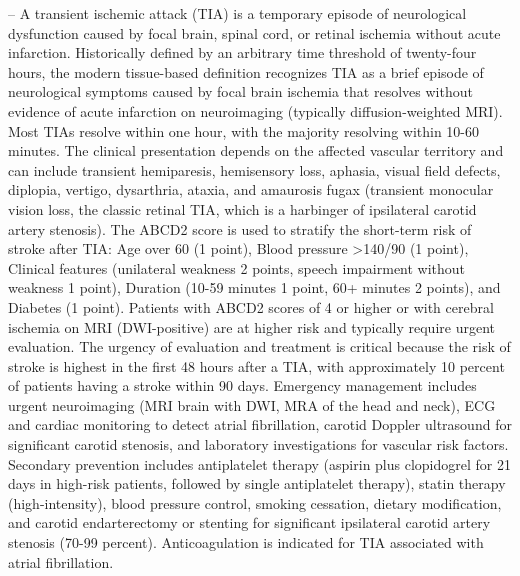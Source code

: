 -- A transient ischemic attack (TIA) is a temporary episode of neurological dysfunction caused by focal brain, spinal cord, or retinal ischemia without acute infarction. Historically defined by an arbitrary time threshold of twenty-four hours, the modern tissue-based definition recognizes TIA as a brief episode of neurological symptoms caused by focal brain ischemia that resolves without evidence of acute infarction on neuroimaging (typically diffusion-weighted MRI). Most TIAs resolve within one hour, with the majority resolving within 10-60 minutes. The clinical presentation depends on the affected vascular territory and can include transient hemiparesis, hemisensory loss, aphasia, visual field defects, diplopia, vertigo, dysarthria, ataxia, and amaurosis fugax (transient monocular vision loss, the classic retinal TIA, which is a harbinger of ipsilateral carotid artery stenosis). The ABCD2 score is used to stratify the short-term risk of stroke after TIA: Age over 60 (1 point), Blood pressure >140/90 (1 point), Clinical features (unilateral weakness 2 points, speech impairment without weakness 1 point), Duration (10-59 minutes 1 point, 60+ minutes 2 points), and Diabetes (1 point). Patients with ABCD2 scores of 4 or higher or with cerebral ischemia on MRI (DWI-positive) are at higher risk and typically require urgent evaluation. The urgency of evaluation and treatment is critical because the risk of stroke is highest in the first 48 hours after a TIA, with approximately 10 percent of patients having a stroke within 90 days. Emergency management includes urgent neuroimaging (MRI brain with DWI, MRA of the head and neck), ECG and cardiac monitoring to detect atrial fibrillation, carotid Doppler ultrasound for significant carotid stenosis, and laboratory investigations for vascular risk factors. Secondary prevention includes antiplatelet therapy (aspirin plus clopidogrel for 21 days in high-risk patients, followed by single antiplatelet therapy), statin therapy (high-intensity), blood pressure control, smoking cessation, dietary modification, and carotid endarterectomy or stenting for significant ipsilateral carotid artery stenosis (70-99 percent). Anticoagulation is indicated for TIA associated with atrial fibrillation.

